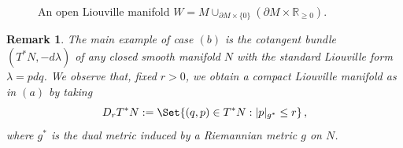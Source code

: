 \documentclass{article}
\newcommand{\1}{\mathbbm{1}}
\newtheorem{rem}[thm]{Remark}
\theoremstyle{remark}
\begin{document}
\begin{figure}[ht]
  \centering
    
  \caption{An open Liouville manifold $W = M \cup_{\partial M \times \{0\}} (\partial M \times \mathbb{R}_{\geq 0})$.}
  \label{W}
\end{figure}

\begin{rem} \label{cot bun}
\textnormal{The main example of case $(b)$ is the cotangent bundle $(T^*N,-d\lambda)$ of any closed smooth manifold $N$ with the standard Liouville form $\lambda = pdq$. We observe that, fixed $r > 0$, we obtain a compact Liouville manifold as in $(a)$ by taking
$$D_rT^*N := \Set{(q, p)\in T^*N: \vert p \vert_{g^*} \leq r}\, ,$$
where $g^*$ is the dual metric induced by a Riemannian metric $g$ on $N$.}
\end{rem}
\end{document}
